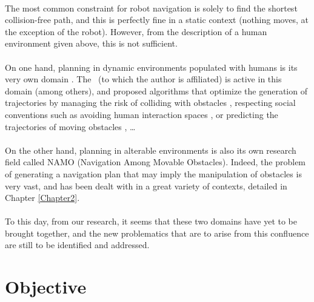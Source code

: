 \paragraph{} The most common constraint for robot navigation is solely to find the shortest collision-free path, and this is perfectly fine in a static context (nothing moves, at the exception of the robot). However, from the description of a human environment given above, this is not sufficient.

\paragraph{} On one hand, planning in dynamic environments populated with humans is its very own domain \parencite{kruse_human-aware_2013, rios-martinez_proxemics_2015}. The \groupname \, (to which the author is affiliated) is active in this domain (among others), and proposed algorithms that optimize the generation of trajectories by managing the risk of colliding with obstacles \parencite{fulgenzi_autonomous_2009, rios-martinez_socially-aware_2013}, respecting social conventions such as avoiding human interaction spaces \parencite{papadakis_adaptive_2014, rios-martinez_understanding_2011}, or predicting the trajectories of moving obstacles \parencite{jumel_mapping_2017}, \dots

\paragraph{} On the other hand, planning in alterable environments is also its own research field called NAMO (Navigation Among Movable Obstacles)\parencite{stilman_navigation_2007}. Indeed, the problem of generating a navigation plan that may imply the manipulation of obstacles is very vast, and has been dealt with in a great variety of contexts, detailed in Chapter \ref{Chapter2}.

\paragraph{} To this day, from our research, it seems that these two domains have yet to be brought together, and the new problematics that are to arise from this confluence are still to be identified and addressed.

\clearpage

\section{Objective}

